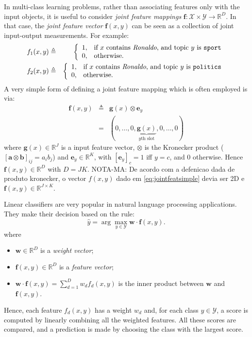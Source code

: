 In multi-class learning problems, rather than associating features only with the input objects, 
it is useful to consider \emph{joint feature mappings} $\boldsymbol{f}:\mathcal{X}\times \mathcal{Y}\rightarrow \mathbb{R}^D$. 
In that case, the \emph{joint feature vector}  $\boldsymbol{f}(x,y)$ can be seen as a collection of joint input-output measurements. 
For example: 
\begin{eqnarray}
f_1(x,y) &\triangleq& 
\left\{
\begin{array}{ll}
1, & \text{if $x$ contains \emph{Ronaldo}, and topic $y$ is {\tt sport}}\\
0, & \text{otherwise.}
\end{array}
\right.\\
f_2(x,y) &\triangleq& 
\left\{
\begin{array}{ll}
1, & \text{if $x$ contains \emph{Ronaldo}, and topic $y$ is {\tt politics}}\\
0, & \text{otherwise.}
\end{array}
\right.
\end{eqnarray}  
A very simple form of defining a joint feature mapping which is often employed is via: 
\begin{eqnarray}\label{eq:jointfeatsimple}
\boldsymbol{f}(x,y) &\triangleq& \boldsymbol{g}(x) \otimes \boldsymbol{e}_y\nonumber\\
&=& (0,\ldots,0,\underbrace{\boldsymbol{g}(x)}_{\text{$y$th slot}},0,\ldots,0)
\end{eqnarray}
where $\boldsymbol{g}(x) \in \mathbb{R}^J$ is a input feature vector, $\otimes$ is the Kronecker product 
($[\boldsymbol{a} \otimes \boldsymbol{b}]_{ij} = a_i b_j$) and 
$\boldsymbol{e}_y \in \mathbb{R}^{K}$, with $[\boldsymbol{e}_y]_c = 1$ iff $y=c$, and 
$0$ otherwise. Hence $\boldsymbol{f}(x,y) \in \mathbb{R}^D$ with $D = JK$.
NOTA-MA: De acordo com a defenicao dada de produto kronecker, o vector $f(x,y)$ dado em
\eqref{eq:jointfeatsimple} devia ser 2D e $\boldsymbol{f}(x,y) \in \mathbb{R}^{J \times K}$.





Linear classifiers are very popular in natural language processing applications. 
They make their decision based on the rule:
\begin{equation}
{\hat y} = \arg\max_{y \in \mathcal{Y}} \boldsymbol{w} \cdot \boldsymbol{f}(x,y).
\end{equation}
where
\begin{itemize}
\item $\boldsymbol{w} \in \mathbb{R}^D$ is a \emph{weight vector};
\item $\boldsymbol{f}(x,y) \in \mathbb{R}^D$ is a \emph{feature vector};
\item $\boldsymbol{w} \cdot \boldsymbol{f}(x,y) = \sum_{d=1}^D w_d f_d(x,y)$ is the inner product between $\boldsymbol{w}$ and $\boldsymbol{f}(x,y)$. 
\end{itemize}
Hence, each feature $f_d(x,y)$ has a weight $w_d$ and, for each class $y \in \mathcal{Y}$, 
a score is computed by linearly combining all the weighted features. All these scores are compared, 
and a prediction is made 
by choosing the class with the largest score. 

